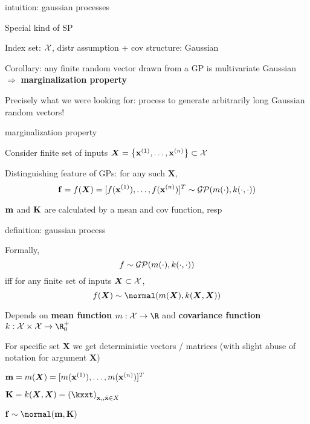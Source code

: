 \documentclass[11pt,compress,t,notes=noshow, xcolor=table]{beamer}
\begin{document}

\begin{framei}[sep=L]{intuition: gaussian processes}
\item Special kind of SP 
\item Index set: $\Xspace$, distr assumption + cov structure: Gaussian 
\item Corollary: any finite random vector drawn from a GP is multivariate Gaussian $\Rightarrow$ \textbf{marginalization property}
\vfill
{}
\vfill
\item Precisely what we were looking for: process to generate arbitrarily long Gaussian random vectors!
\end{framei}

\begin{framei}[sep=L]{marginalization property}
\item Consider finite set of inputs $\bm{X} = \xdat \subset \Xspace$
\item Distinguishing feature of GPs: for any such $\bm{X}$,
    $$
      \fv = f(\bm{X}) = \fvec^T \sim \gpmk
    $$ 
\item $\mv$ and $\Kmat$ are calculated by a mean and cov function, resp
\vfill
{}
\end{framei}

\begin{framei}[sep=L]{definition: gaussian process}
\item Formally, 
$$f \sim \gpmk$$
iff for any finite set of inputs $\bm{X} \subset \Xspace$, 
$$
f(\bm{X}) \sim \normal(\mX, \kXX)
$$
\item Depends on \textbf{mean function} $m: \Xspace \rightarrow \R$ and \textbf{covariance function} $k: \Xspace \times \Xspace \rightarrow \R^+_0$
\item For specific set $\bm{X}$ we get deterministic vectors / matrices (with slight abuse of notation for argument $\bm{X}$)
\vfill
\begin{itemizeM}
\item $\mv = m(\bm{X}) = [m(\xi[1]), \dots, m(\xi[n])]^T$
\item $\Kmat = k(\bm{X}, \bm{X}) = \left(\kxxt \right)_{\xv, , \xtil \in X}$
\item $\fv \sim \normal(\mv, \Kmat)$
\end{itemizeM}
\end{framei}
\end{document}
